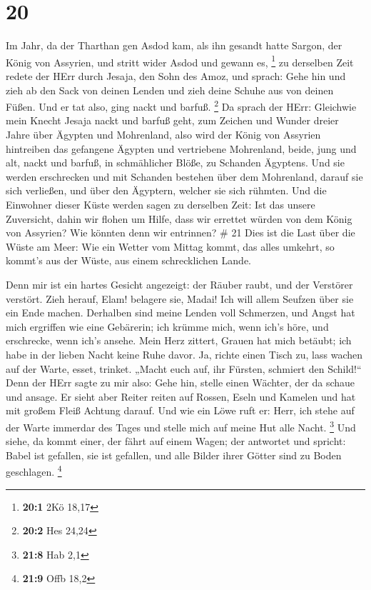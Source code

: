 \hypertarget{section-10}{%
\section{20}\label{section-10}}

 Im Jahr, da der Tharthan gen Asdod kam, als ihn gesandt
hatte Sargon, der König von Assyrien, und stritt wider Asdod und gewann
es, \footnote{\textbf{20:1} 2Kö 18,17}  zu derselben Zeit
redete der HErr durch Jesaja, den Sohn des Amoz, und sprach: Gehe hin
und zieh ab den Sack von deinen Lenden und zieh deine Schuhe aus von
deinen Füßen. Und er tat also, ging nackt und barfuß. \footnote{\textbf{20:2}
  Hes 24,24}  Da sprach der HErr: Gleichwie mein Knecht
Jesaja nackt und barfuß geht, zum Zeichen und Wunder dreier Jahre über
Ägypten und Mohrenland,  also wird der König von Assyrien
hintreiben das gefangene Ägypten und vertriebene Mohrenland, beide, jung
und alt, nackt und barfuß, in schmählicher Blöße, zu Schanden Ägyptens.
 Und sie werden erschrecken und mit Schanden bestehen über
dem Mohrenland, darauf sie sich verließen, und über den Ägyptern,
welcher sie sich rühmten.  Und die Einwohner dieser Küste
werden sagen zu derselben Zeit: Ist das unsere Zuversicht, dahin wir
flohen um Hilfe, dass wir errettet würden von dem König von Assyrien?
Wie könnten denn wir entrinnen? \# 21  Dies ist die Last
über die Wüste am Meer: Wie ein Wetter vom Mittag kommt, das alles
umkehrt, so kommt's aus der Wüste, aus einem schrecklichen Lande.

 Denn mir ist ein hartes Gesicht angezeigt: der Räuber
raubt, und der Verstörer verstört. Zieh herauf, Elam! belagere sie,
Madai! Ich will allem Seufzen über sie ein Ende machen. 
Derhalben sind meine Lenden voll Schmerzen, und Angst hat mich ergriffen
wie eine Gebärerin; ich krümme mich, wenn ich's höre, und erschrecke,
wenn ich's ansehe.  Mein Herz zittert, Grauen hat mich
betäubt; ich habe in der lieben Nacht keine Ruhe davor.  Ja,
richte einen Tisch zu, lass wachen auf der Warte, esset, trinket. „Macht
euch auf, ihr Fürsten, schmiert den Schild!{}``  Denn der
HErr sagte zu mir also: Gehe hin, stelle einen Wächter, der da schaue
und ansage.  Er sieht aber Reiter reiten auf Rossen, Eseln
und Kamelen und hat mit großem Fleiß Achtung darauf.  Und
wie ein Löwe ruft er: Herr, ich stehe auf der Warte immerdar des Tages
und stelle mich auf meine Hut alle Nacht. \footnote{\textbf{21:8} Hab
  2,1}  Und siehe, da kommt einer, der fährt auf einem
Wagen; der antwortet und spricht: Babel ist gefallen, sie ist gefallen,
und alle Bilder ihrer Götter sind zu Boden geschlagen. \footnote{\textbf{21:9}
  Offb 18,2}

